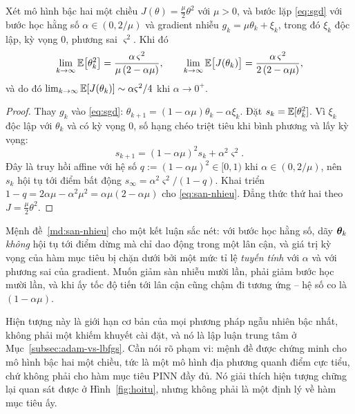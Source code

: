 \begin{menhde}
\label{md:san-nhieu}
Xét mô hình bậc hai một chiều $J(\theta) = \tfrac{\mu}{2}\theta^2$ với $\mu > 0$,
và bước lặp \eqref{eq:sgd} với bước học hằng số $\alpha \in (0, 2/\mu)$ và
gradient nhiễu $g_k = \mu\theta_k + \xi_k$, trong đó $\xi_k$ độc lập, kỳ vọng
$0$, phương sai $\varsigma^2$. Khi đó
\begin{equation}
\lim_{k\to\infty}\mathbb{E}\big[\theta_k^2\big]
 = \frac{\alpha\,\varsigma^{2}}{\mu\,(2-\alpha\mu)},
\qquad
\lim_{k\to\infty}\mathbb{E}\big[J(\theta_k)\big]
 = \frac{\alpha\,\varsigma^{2}}{2\,(2-\alpha\mu)},
\label{eq:san-nhieu}
\end{equation}
và do đó $\lim_{k\to\infty}\mathbb{E}[J(\theta_k)] \sim \alpha\varsigma^{2}/4$ khi
$\alpha \to 0^{+}$.
\end{menhde}
 
\begin{proof}
Thay $g_k$ vào \eqref{eq:sgd}:
$\theta_{k+1} = (1-\alpha\mu)\theta_k - \alpha\xi_k$. Đặt
$s_k = \mathbb{E}[\theta_k^2]$. Vì $\xi_k$ độc lập với $\theta_k$ và có kỳ vọng $0$, số
hạng chéo triệt tiêu khi bình phương và lấy kỳ vọng:
\[
s_{k+1} = (1-\alpha\mu)^2 s_k + \alpha^2\varsigma^2 .
\]
Đây là truy hồi affine với hệ số $q := (1-\alpha\mu)^2 \in [0,1)$ khi
$\alpha \in (0,2/\mu)$, nên $s_k$ hội tụ tới điểm bất động
$s_\infty = \alpha^2\varsigma^2/(1-q)$. Khai triển
$1 - q = 2\alpha\mu - \alpha^2\mu^2 = \alpha\mu(2-\alpha\mu)$ cho
\eqref{eq:san-nhieu}. Đẳng thức thứ hai theo $J = \tfrac{\mu}{2}\theta^2$.
\end{proof}
 
\begin{nhanxet}
\label{nx:noise-floor}
Mệnh đề~\ref{md:san-nhieu} cho một kết luận sắc nét: với bước học hằng số, dãy
$\bm{\theta}_k$ \emph{không} hội tụ tới điểm dừng mà chỉ dao động trong một lân cận,
và giá trị kỳ vọng của hàm mục tiêu bị chặn dưới bởi một mức tỉ lệ \emph{tuyến
tính} với $\alpha$ và với phương sai của gradient. Muốn giảm sàn nhiễu mười lần,
phải giảm bước học mười lần, và khi ấy tốc độ tiến tới lân cận cũng chậm đi
tương ứng -- hệ số co là $(1-\alpha\mu)$.
 
Hiện tượng này là giới hạn cơ bản của mọi phương pháp ngẫu nhiên bậc nhất, không
phải một khiếm khuyết cài đặt, và nó là lập luận trung tâm ở
Mục~\ref{subsec:adam-vs-lbfgs}. Cần nói rõ phạm vi: mệnh đề được chứng minh cho
mô hình bậc hai một chiều, tức là một mô hình địa phương quanh điểm cực tiểu, chứ
không phải cho hàm mục tiêu PINN đầy đủ. Nó giải thích hiện tượng chững lại quan
sát được ở Hình~\ref{fig:hoitu}, nhưng không phải là một định lý về hàm mục tiêu
ấy.
\end{nhanxet}
 
